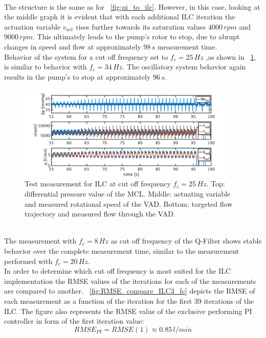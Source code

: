 \\The structure is the same as for \figurename~\ref{fig:pi_to_ilc}. However, in this case, looking at the middle graph it is evident that with each additional ILC iteration the actuation variable $v_{act}$ rises further towards its saturation values $4000\,rpm$ and $9000\,rpm$. This ultimately leads to the pump's rotor to stop, due to abrupt changes in speed and flow at approximately $98\,s$ measurement time.
\\Behavior of the system for a cut off frequency set to $f_c=25\,Hz$ ,as shown in \figurename~\ref{fig:pi_to_ilc_fc_25}, is similar to behavior with $f_c=34\,Hz$. The oscillatory system behavior again results in the pump's to stop at approximately $96\,s$.
\begin{figure}[ht]
  \centering
  \includegraphics[width=0.95\textwidth]{images/chapt_5/ILC/pi_to_ilc_fc_25.pdf}
  \caption[Test measurement for ILC at cut off frequency $f_c=25\,Hz$]{Test measurement for ILC at cut off frequency $f_c=25\,Hz$. Top: differential pressure value of the MCL. Middle: actuating variable and measured rotational speed of the VAD. Bottom: targeted flow trajectory and measured flow through the VAD.}
  \label{fig:pi_to_ilc_fc_25}
\end{figure}
\\The measurement with $f_c=8\,Hz$ as cut off frequency of the Q-Filter shows stable behavior over the complete measurement time, similar to the measurement performed with $f_c=20\,Hz$.
\\In order to determine which cut off frequency is most suited for the ILC implementation the RMSE values of the iterations for each of the measurements are compared to another. \figurename~\ref{fig:RMSE_compare_ILC3_fc} depicts the RMSE of each measurement as a function of the iteration for the first 39 iterations of the ILC. The figure also represents the RMSE value of the exclusive performing PI controller in form of the first iteration value:
\begin{equation}
  RMSE_{PI}=RMSE(1)\approx 0.85\,l/min
\end{equation}
